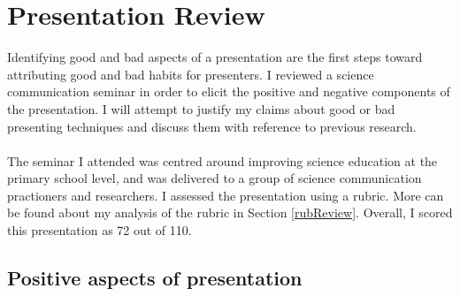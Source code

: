 \section{Presentation Review} \label{semRev}

Identifying good and bad aspects of a presentation are the first steps toward attributing good and
bad habits for presenters.
I reviewed a science communication seminar in order to elicit the positive and negative components of
the presentation.
I will attempt to justify my claims about good or bad presenting techniques and
discuss them with reference to previous research.\\
\\
The seminar I attended was centred around improving science education at the primary school level,
and was delivered to a group of science communication practioners and researchers.
I assessed the presentation using a rubric.
More can be found about my analysis of the rubric in Section \ref{rubReview}.
Overall, I scored this presentation as 72 out of 110.

\subsection{Positive aspects of presentation} \label{semRevPlus}

